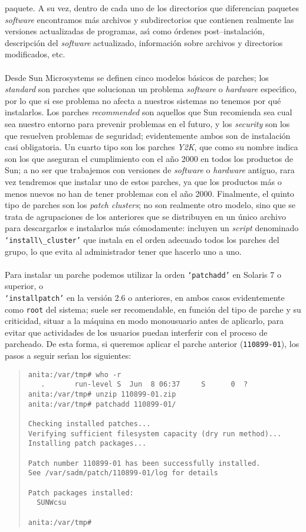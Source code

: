 paquete. A su vez, dentro de cada uno de los directorios que diferencian 
paquetes {\it software} encontramos m\'as archivos y subdirectorios que
contienen realmente las versiones actualizadas de programas, as\'{\i} como 
\'ordenes post--instalaci\'on, descripci\'on del {\it software} actualizado, 
informaci\'on sobre archivos y directorios modificados, etc.\\
\\Desde Sun Microsystems se definen cinco modelos b\'asicos de parches; los {\it
standard} son parches que solucionan un problema {\it software} o {\it hardware}
espec\'{\i}fico, por lo que si ese problema no afecta a nuestros sistemas 
no tenemos por qu\'e instalarlos. Los parches {\it recommended} son aquellos que
Sun recomienda sea cual sea nuestro entorno para prevenir problemas en el 
futuro, y los {\it security} son los que resuelven problemas de seguridad; 
evidentemente ambos son de instalaci\'on casi obligatoria. Un cuarto tipo son 
los parches {\it Y2K}, que como su nombre indica son los que aseguran el
cumplimiento con el a\~no 2000 en todos los productos de Sun; a no ser que 
trabajemos con versiones de {\it software} o {\it hardware} antiguo, rara vez
tendremos que instalar uno de estos parches, ya que los productos m\'as o menos 
nuevos no han de tener problemas con el a\~no 2000. Finalmente, el quinto tipo
de parches son los {\it patch clusters}; no son realmente otro modelo, sino que
se trata de agrupaciones de los anteriores que se distribuyen en un \'unico 
archivo para descargarlos e instalarlos m\'as c\'omodamente: incluyen un {\it
script} denominado {\tt `install$\_$cluster'} que instala en el orden adecuado
todos los parches del grupo, lo que evita al administrador tener que hacerlo
uno a uno.\\
\\Para instalar un parche podemos utilizar la orden {\tt `patchadd'} en Solaris
7 o superior, o {\tt \\`installpatch'} en la versi\'on 2.6 o anteriores, en 
ambos 
casos evidentemente como {\tt root} del sistema; suele ser recomendable, en 
funci\'on del tipo de parche y su criticidad, situar a la m\'aquina en modo
monousuario antes de aplicarlo, para evitar que actividades de los usuarios
puedan interferir con el proceso de parcheado. De esta forma, si queremos
aplicar el parche anterior ({\tt 110899-01}), los pasos a seguir ser\'{\i}an los
siguientes:
\begin{quote}
\begin{verbatim}
anita:/var/tmp# who -r
   .       run-level S  Jun  8 06:37     S      0  ?
anita:/var/tmp# unzip 110899-01.zip
anita:/var/tmp# patchadd 110899-01/

Checking installed patches...
Verifying sufficient filesystem capacity (dry run method)...
Installing patch packages...

Patch number 110899-01 has been successfully installed.
See /var/sadm/patch/110899-01/log for details

Patch packages installed:
  SUNWcsu

anita:/var/tmp# 
\end{verbatim}
\end{quote}
